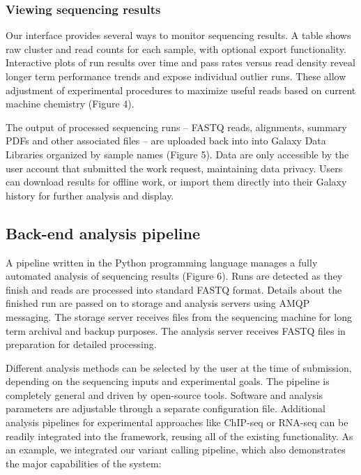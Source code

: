\documentclass[10pt]{bmc_article}
\newenvironment{bmcformat}{\begin{raggedright}\baselineskip20pt\sloppy\setboolean{publ}{false}}{\end{raggedright}\baselineskip20pt\sloppy}
\begin{document}
\begin{bmcformat}
\subsubsection*{Viewing sequencing results}

Our interface provides several ways to monitor sequencing results.
A table shows raw cluster and read counts for each sample, with
optional export functionality.  Interactive plots of run results over
time and pass rates versus read density reveal longer term performance
trends and expose individual outlier runs. These allow adjustment of
experimental procedures to maximize useful reads based on current
machine chemistry (Figure 4).

The output of processed sequencing runs -- FASTQ reads, alignments,
summary PDFs and other associated files -- are uploaded back
into into Galaxy Data Libraries organized by sample names (Figure
5). Data are only accessible by the user account that submitted the
work request, maintaining data privacy. Users can download results for
offline work, or import them directly into their Galaxy history for
further analysis and display.

\subsection*{Back-end analysis pipeline}

A pipeline written in the Python programming language manages a fully
automated analysis of sequencing results (Figure 6). Runs are detected
as they finish and reads are processed into standard FASTQ
format. Details about the finished run are passed on to storage and
analysis servers using AMQP messaging. The storage server receives
files from the sequencing machine for long term archival and backup
purposes. The analysis server receives FASTQ files in preparation for
detailed processing.

Different analysis methods can be selected by the user at the time of
submission, depending on the sequencing inputs and experimental
goals. The pipeline is completely general and driven by open-source
tools. Software and analysis parameters are adjustable through a
separate configuration file. Additional analysis pipelines for
experimental approaches like ChIP-seq or RNA-seq can be readily
integrated into the framework, reusing all of the existing
functionality. As an example, we integrated our variant calling pipeline,
which also demonstrates the major capabilities of the system:


\end{bmcformat}
\end{document}
